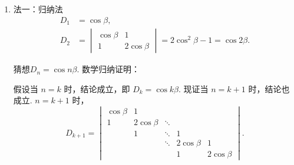 \documentclass[UTF8,12pt,a4paper,fontset=fandol]{ctexart}
\begin{document}
\begin{solve}
\begin{enumerate}
        \item 法一：归纳法
            \begin{align*}
                D_1 & =\cos\beta,                               \\
                D_2 & =\begin{vmatrix}
                            \cos\beta & 1          \\
                            1         & 2\cos\beta
                        \end{vmatrix}=2\cos^2\beta-1=\cos2\beta.
            \end{align*}

            猜想$D_n=\cos n\beta$. 数学归纳证明：

            假设当 $n=k$ 时，结论成立，即 $D_{k}=\cos k \beta$. 现证当 $n=k+1$ 时，结论也成立. $ n=k+1 $ 时，
            \[ D_{k+1} = \begin{vmatrix}
                    \cos \beta & 1            &        &              &              \\
                    1          & 2 \cos \beta & \ddots &              &              \\
                                & 1            & \ddots & 1            &              \\
                                &              & \ddots & 2 \cos \beta & 1            \\
                                &              &        & 1            & 2 \cos \beta
                \end{vmatrix}. \]


\end{enumerate}
\end{solve}
\end{document}
